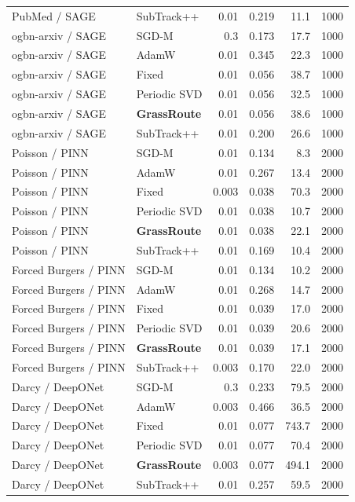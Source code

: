 {\begin{longtable}{llrrrr}
PubMed / SAGE & SubTrack++ & 0.01 & 0.219 & 11.1 & 1000 \\
ogbn-arxiv / SAGE & SGD-M & 0.3 & 0.173 & 17.7 & 1000 \\
ogbn-arxiv / SAGE & AdamW & 0.01 & 0.345 & 22.3 & 1000 \\
ogbn-arxiv / SAGE & Fixed & 0.01 & 0.056 & 38.7 & 1000 \\
ogbn-arxiv / SAGE & Periodic SVD & 0.01 & 0.056 & 32.5 & 1000 \\
\rowcolor{oursbg}ogbn-arxiv / SAGE & \textbf{GrassRoute} & 0.01 & 0.056 & 38.6 & 1000 \\
ogbn-arxiv / SAGE & SubTrack++ & 0.01 & 0.200 & 26.6 & 1000 \\
Poisson / PINN & SGD-M & 0.01 & 0.134 & 8.3 & 2000 \\
Poisson / PINN & AdamW & 0.01 & 0.267 & 13.4 & 2000 \\
Poisson / PINN & Fixed & 0.003 & 0.038 & 70.3 & 2000 \\
Poisson / PINN & Periodic SVD & 0.01 & 0.038 & 10.7 & 2000 \\
\rowcolor{oursbg}Poisson / PINN & \textbf{GrassRoute} & 0.01 & 0.038 & 22.1 & 2000 \\
Poisson / PINN & SubTrack++ & 0.01 & 0.169 & 10.4 & 2000 \\
Forced Burgers / PINN & SGD-M & 0.01 & 0.134 & 10.2 & 2000 \\
Forced Burgers / PINN & AdamW & 0.01 & 0.268 & 14.7 & 2000 \\
Forced Burgers / PINN & Fixed & 0.01 & 0.039 & 17.0 & 2000 \\
Forced Burgers / PINN & Periodic SVD & 0.01 & 0.039 & 20.6 & 2000 \\
\rowcolor{oursbg}Forced Burgers / PINN & \textbf{GrassRoute} & 0.01 & 0.039 & 17.1 & 2000 \\
Forced Burgers / PINN & SubTrack++ & 0.003 & 0.170 & 22.0 & 2000 \\
Darcy / DeepONet & SGD-M & 0.3 & 0.233 & 79.5 & 2000 \\
Darcy / DeepONet & AdamW & 0.003 & 0.466 & 36.5 & 2000 \\
Darcy / DeepONet & Fixed & 0.01 & 0.077 & 743.7 & 2000 \\
Darcy / DeepONet & Periodic SVD & 0.01 & 0.077 & 70.4 & 2000 \\
\rowcolor{oursbg}Darcy / DeepONet & \textbf{GrassRoute} & 0.003 & 0.077 & 494.1 & 2000 \\
Darcy / DeepONet & SubTrack++ & 0.01 & 0.257 & 59.5 & 2000 \\

\end{longtable}}
